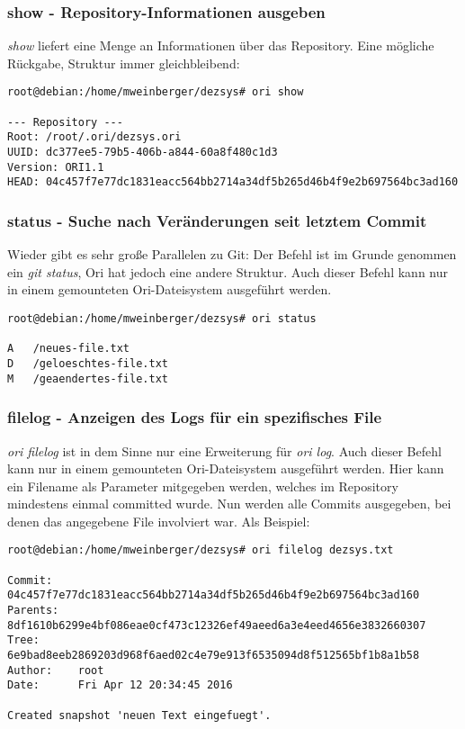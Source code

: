 \subsubsection{show - Repository-Informationen ausgeben}
\label{subsubsec:show - Repository-Informationen ausgeben}
\textit{show} liefert eine Menge an Informationen über das Repository. Eine mögliche Rückgabe, Struktur immer gleichbleibend:
\begin{lstlisting}[frame=single, caption=show]
root@debian:/home/mweinberger/dezsys# ori show

--- Repository ---
Root: /root/.ori/dezsys.ori
UUID: dc377ee5-79b5-406b-a844-60a8f480c1d3
Version: ORI1.1
HEAD: 04c457f7e77dc1831eacc564bb2714a34df5b265d46b4f9e2b697564bc3ad160
\end{lstlisting}

\subsubsection{status - Suche nach Veränderungen seit letztem Commit}
\label{subsubsec:status - Suche nach Veränderungen seit letztem Commit}
Wieder gibt es sehr große Parallelen zu Git: Der Befehl ist im Grunde genommen ein \textit{git status}, Ori hat jedoch eine andere Struktur. Auch dieser Befehl kann nur in einem gemounteten Ori-Dateisystem ausgeführt werden.
\begin{lstlisting}[frame=single, caption=status]
root@debian:/home/mweinberger/dezsys# ori status

A	/neues-file.txt
D	/geloeschtes-file.txt
M	/geaendertes-file.txt
\end{lstlisting}

\clearpage

\subsubsection{filelog - Anzeigen des Logs für ein spezifisches File}
\label{subsubsec:filelog - Anzeigen des Logs für ein spezifisches File}
\textit{ori filelog} ist in dem Sinne nur eine Erweiterung für \textit{ori log}. Auch dieser Befehl kann nur in einem gemounteten Ori-Dateisystem ausgeführt werden. Hier kann ein Filename als Parameter mitgegeben werden, welches im Repository mindestens einmal committed wurde. Nun werden alle Commits ausgegeben, bei denen das angegebene File involviert war. Als Beispiel:
\begin{lstlisting}[frame=single, caption=filelog]
root@debian:/home/mweinberger/dezsys# ori filelog dezsys.txt

Commit:    04c457f7e77dc1831eacc564bb2714a34df5b265d46b4f9e2b697564bc3ad160
Parents:   8df1610b6299e4bf086eae0cf473c12326ef49aeed6a3e4eed4656e3832660307
Tree:      6e9bad8eeb2869203d968f6aed02c4e79e913f6535094d8f512565bf1b8a1b58
Author:    root
Date:      Fri Apr 12 20:34:45 2016

Created snapshot 'neuen Text eingefuegt'.
\end{lstlisting}

